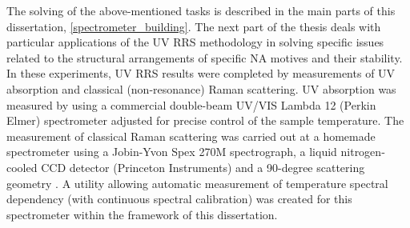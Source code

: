 The solving of the above-mentioned tasks is described in the main parts of this
dissertation,
\cref{spectrometer_building}.
The next part of the thesis deals with particular applications of the UV RRS
methodology in solving specific issues related to the structural arrangements
of specific NA motives and their stability.
In these experiments, UV RRS results were completed by measurements of UV
absorption and classical (non-resonance) Raman scattering.
UV absorption was measured by using a commercial double-beam UV/VIS
Lambda 12 (Perkin Elmer) spectrometer adjusted for precise control of the
sample temperature.
The measurement of classical Raman scattering was carried out at a homemade
spectrometer using a Jobin-Yvon Spex 270M spectrograph, a liquid
nitrogen‐cooled CCD detector (Princeton Instruments) and a 90-degree
scattering geometry
\parencite{Palacky2011}.
A utility allowing automatic measurement of temperature spectral dependency
(with continuous spectral calibration) was created for this spectrometer within
the framework of this dissertation.
